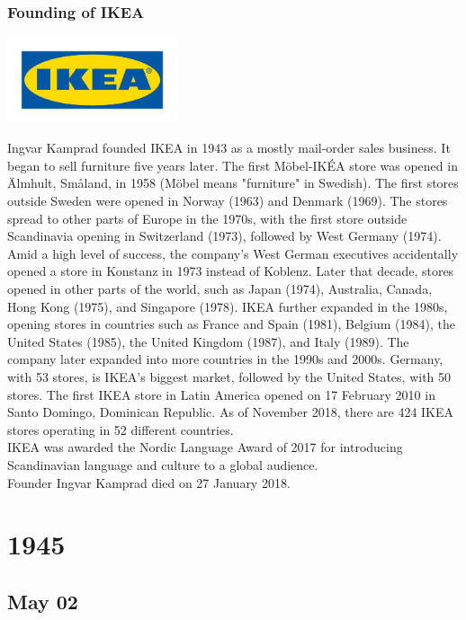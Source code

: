 \documentclass[11pt]{report}
\begin{document}
\subsection{Founding of IKEA}
\vspace{2mm}\begin{center}\includegraphics[width=5cm]{./img/ikeaLogo.jpg}\end{center}
Ingvar Kamprad founded IKEA in 1943 as a mostly mail-order sales business. It began to sell furniture five years later. The first Möbel-IKÉA store was opened in Älmhult, Småland, in 1958 (Möbel means "furniture" in Swedish). The first stores outside Sweden were opened in Norway (1963) and Denmark (1969). The stores spread to other parts of Europe in the 1970s, with the first store outside Scandinavia opening in Switzerland (1973), followed by West Germany (1974).\\ 
\indent Amid a high level of success, the company's West German executives accidentally opened a store in Konstanz in 1973 instead of Koblenz. Later that decade, stores opened in other parts of the world, such as Japan (1974), Australia, Canada, Hong Kong (1975), and Singapore (1978). IKEA further expanded in the 1980s, opening stores in countries such as France and Spain (1981), Belgium (1984), the United States (1985), the United Kingdom (1987), and Italy (1989). The company later expanded into more countries in the 1990s and 2000s. Germany, with 53 stores, is IKEA's biggest market, followed by the United States, with 50 stores. The first IKEA store in Latin America opened on 17 February 2010 in Santo Domingo, Dominican Republic. As of November 2018, there are 424 IKEA stores operating in 52 different countries.\\ \indent IKEA was awarded the Nordic Language Award of 2017 for introducing Scandinavian language and culture to a global audience.\\
\indent Founder Ingvar Kamprad died on 27 January 2018.

\chapter{1945}
\section{May 02}
\end{document}
